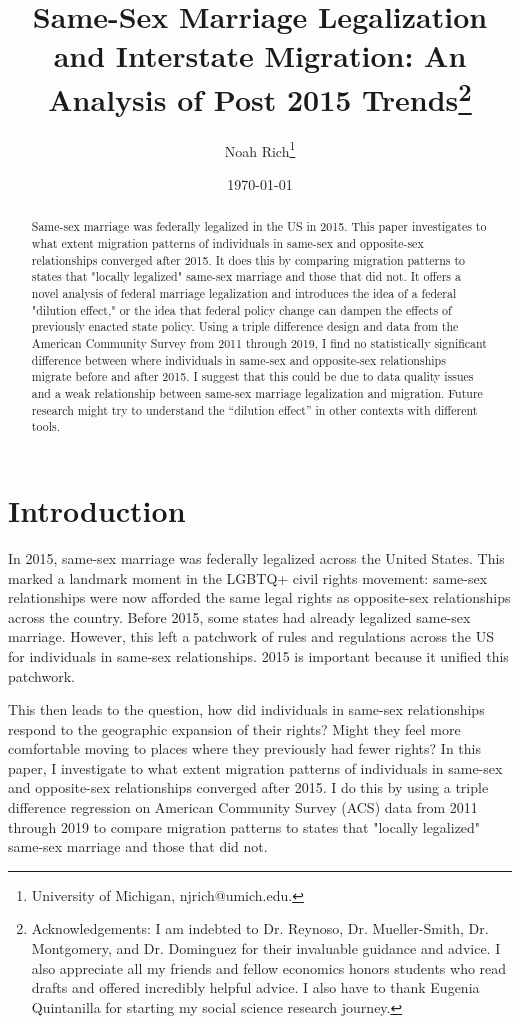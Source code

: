 \documentclass[12pt,letterpaper]{article}
\title{Same-Sex Marriage Legalization and Interstate Migration: An Analysis of Post 2015 Trends\footnote{Acknowledgements: I am indebted to Dr. Reynoso, Dr. Mueller-Smith, Dr. Montgomery, and Dr. Dominguez for their invaluable guidance and advice. I also appreciate all my friends and fellow economics honors students who read drafts and offered incredibly helpful advice. I also have to thank Eugenia Quintanilla for starting my social science research journey.}}
\author{Noah Rich\footnote{University of Michigan, njrich@umich.edu.}}
\date{\today}
\begin{document}
\maketitle


\begin{abstract}
Same-sex marriage was federally legalized in the US in 2015. This paper investigates to what extent migration patterns of individuals in same-sex and opposite-sex relationships converged after 2015. It does this by comparing migration patterns to states that "locally legalized" same-sex marriage and those that did not. It offers a novel analysis of federal marriage legalization and introduces the idea of a federal "dilution effect," or the idea that federal policy change can dampen the effects of previously enacted state policy. Using a triple difference design and data from the American Community Survey from 2011 through 2019, I find no statistically significant difference between where individuals in same-sex and opposite-sex relationships migrate before and after 2015. I suggest that this could be due to data quality issues and a weak relationship between same-sex marriage legalization and migration. Future research might try to understand the “dilution effect” in other contexts with different tools.
\end{abstract}

\newpage

\section{Introduction}

In 2015, same-sex marriage was federally legalized across the United States. This marked a landmark moment in the LGBTQ+ civil rights movement: same-sex relationships were now afforded the same legal rights as opposite-sex relationships across the country. Before 2015, some states had already legalized same-sex marriage. However, this left a patchwork of rules and regulations across the US for individuals in same-sex relationships. 2015 is important because it unified this patchwork.

This then leads to the question, how did individuals in same-sex relationships respond to the geographic expansion of their rights? Might they feel more comfortable moving to places where they previously had fewer rights? In this paper, I investigate to what extent migration patterns of individuals in same-sex and opposite-sex relationships converged after 2015. I do this by using a triple difference regression on American Community Survey (ACS) data from 2011 through 2019 to compare migration patterns to states that "locally legalized" same-sex marriage and those that did not. 
\end{document}
